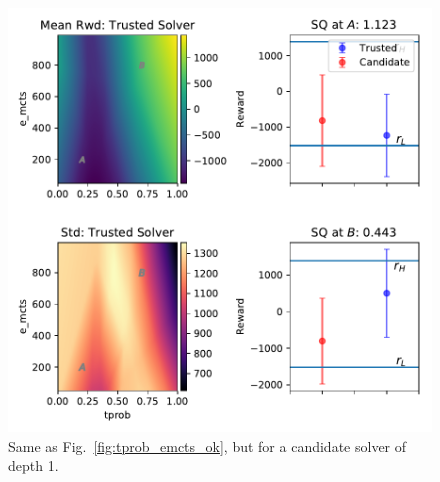 \begin{figure}[tbp]
    \centering
    \includegraphics[width=0.9\linewidth]{Figures/transition_e_vary_e_mctstprob_bad.pdf}
    \caption{Same as Fig.~\ref{fig:tprob_emcts_ok}, but for a candidate solver of depth 1.}
    \label{fig:tprob_emcts_bad}
\end{figure}
